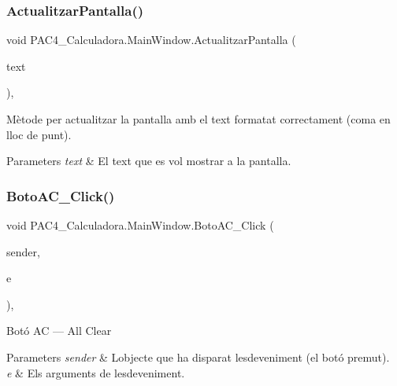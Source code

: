 \subsubsection{\texorpdfstring{Actualitzar\+Pantalla()}{ActualitzarPantalla()}}
{\footnotesize\ttfamily void P\+A\+C4\+\_\+\+Calculadora.\+Main\+Window.\+Actualitzar\+Pantalla (\begin{DoxyParamCaption}\item[{string}]{text }\end{DoxyParamCaption})\hspace{0.3cm}{\ttfamily [inline]}, {\ttfamily [private]}}



Mètode per actualitzar la pantalla amb el text formatat correctament (coma en lloc de punt). 


\begin{DoxyParams}{Parameters}
{\em text} & El text que es vol mostrar a la pantalla.\\
\hline
\end{DoxyParams}
\mbox{\label{class_p_a_c4___calculadora_1_1_main_window_ac90763ab3827e3b9dac17a80f9303b25}} 
\subsubsection{\texorpdfstring{Boto\+A\+C\+\_\+\+Click()}{BotoAC\_Click()}}
{\footnotesize\ttfamily void P\+A\+C4\+\_\+\+Calculadora.\+Main\+Window.\+Boto\+A\+C\+\_\+\+Click (\begin{DoxyParamCaption}\item[{object}]{sender,  }\item[{Routed\+Event\+Args}]{e }\end{DoxyParamCaption})\hspace{0.3cm}{\ttfamily [inline]}, {\ttfamily [private]}}



Botó AC — All Clear 


\begin{DoxyParams}{Parameters}
{\em sender} & L\textquotesingle{}objecte que ha disparat l\textquotesingle{}esdeveniment (el botó premut).\\
\hline
{\em e} & Els arguments de l\textquotesingle{}esdeveniment.\\
\hline
\end{DoxyParams}
\mbox{\label{class_p_a_c4___calculadora_1_1_main_window_ab1645c298f24fcedef1ad01c81f3da86}} 
